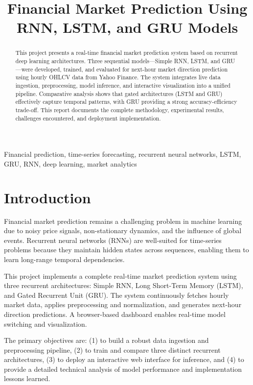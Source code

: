 \documentclass[conference]{IEEEtran}
\title{Financial Market Prediction Using RNN, LSTM, and GRU Models}
\author{
\IEEEauthorblockN{Sir Asif Ameer, Omer Farooq Khan, Aun Ali, Ahsan Butt}
\IEEEauthorblockA{
Department of Computer Science\\
Your University Name\\
email1@domain.com, email2@domain.com, email3@domain.com, email4@domain.com
}
}
\begin{document}
\maketitle

\begin{abstract}
This project presents a real-time financial market prediction system based on recurrent deep learning architectures. Three sequential models---Simple RNN, LSTM, and GRU---were developed, trained, and evaluated for next-hour market direction prediction using hourly OHLCV data from Yahoo Finance. The system integrates live data ingestion, preprocessing, model inference, and interactive visualization into a unified pipeline. Comparative analysis shows that gated architectures (LSTM and GRU) effectively capture temporal patterns, with GRU providing a strong accuracy-efficiency trade-off. This report documents the complete methodology, experimental results, challenges encountered, and deployment implementation.
\end{abstract}

\begin{IEEEkeywords}
Financial prediction, time-series forecasting, recurrent neural networks, LSTM, GRU, RNN, deep learning, market analytics
\end{IEEEkeywords}

\section{Introduction}
Financial market prediction remains a challenging problem in machine learning due to noisy price signals, non-stationary dynamics, and the influence of global events. Recurrent neural networks (RNNs) are well-suited for time-series problems because they maintain hidden states across sequences, enabling them to learn long-range temporal dependencies.

This project implements a complete real-time market prediction system using three recurrent architectures: Simple RNN, Long Short-Term Memory (LSTM), and Gated Recurrent Unit (GRU). The system continuously fetches hourly market data, applies preprocessing and normalization, and generates next-hour direction predictions. A browser-based dashboard enables real-time model switching and visualization.

The primary objectives are: (1) to build a robust data ingestion and preprocessing pipeline, (2) to train and compare three distinct recurrent architectures, (3) to deploy an interactive web interface for inference, and (4) to provide a detailed technical analysis of model performance and implementation lessons learned.
\end{document}
